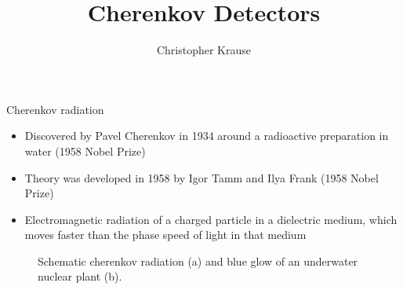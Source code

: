 \documentclass[aspectratio=1610, 10pt]{beamer}
\title{\Large{Cherenkov Detectors}}
\author[C.~Krause]{\normalsize{Christopher Krause}}
\begin{document}
\maketitle


\begin{frame}{Cherenkov radiation}
  \begin{itemize}
    \item Discovered by Pavel Cherenkov in 1934 around a radioactive preparation in water (1958 Nobel Prize)
    \item Theory was developed in 1958 by Igor Tamm and Ilya Frank (1958 Nobel Prize)
    \item Electromagnetic radiation of a charged particle in a dielectric medium, which moves
    faster than the phase speed of light in that medium
  \end{itemize}
  \begin{figure}
      \hspace{1cm}
  \caption{Schematic cherenkov radiation (a) and blue glow of an underwater nuclear plant (b).}
  \end{figure}
\end{frame}
\end{document}
